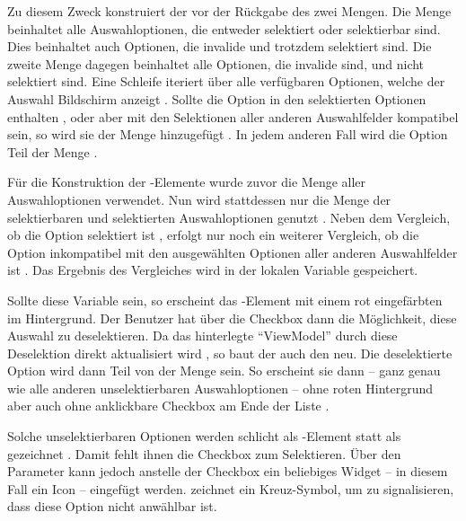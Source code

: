 Zu diesem Zweck konstruiert der  vor der Rückgabe des  zwei Mengen.
Die Menge   beinhaltet alle Auswahloptionen,
die entweder selektiert oder selektierbar sind.
Dies beinhaltet auch Optionen,
die invalide und trotzdem selektiert sind.
Die zweite Menge   dagegen beinhaltet alle Optionen,
die invalide sind,
und nicht selektiert sind.
Eine Schleife iteriert über alle verfügbaren Optionen,
welche der Auswahl Bildschirm anzeigt  .
Sollte die Option in den selektierten Optionen enthalten ,
oder aber mit den Selektionen aller anderen Auswahlfelder kompatibel sein,
so wird sie der Menge  hinzugefügt .
In jedem anderen Fall wird die Option Teil der Menge  .

Für die Konstruktion der -Elemente wurde zuvor die Menge aller Auswahloptionen verwendet.
Nun wird stattdessen nur die Menge der selektierbaren und selektierten Auswahloptionen genutzt .
Neben dem Vergleich,
ob die Option selektiert ist ,
erfolgt nur noch ein weiterer Vergleich,
ob die Option inkompatibel mit den ausgewählten Optionen aller anderen Auswahlfelder ist .
Das Ergebnis des Vergleiches wird in der lokalen Variable  gespeichert.

Sollte diese Variable  sein,
so erscheint das -Element mit einem rot eingefärbten im Hintergrund.
Der Benutzer hat über die Checkbox dann die Möglichkeit,
diese Auswahl zu deselektieren.
Da das hinterlegte \enquote{ViewModel} durch diese Deselektion direkt aktualisiert wird ,
so baut der  auch den  neu.
Die deselektierte Option wird dann Teil von der Menge   sein.
So erscheint sie dann
-- ganz genau wie alle anderen unselektierbaren Auswahloptionen --
ohne roten Hintergrund aber auch ohne anklickbare Checkbox am Ende der Liste .

Solche unselektierbaren Optionen werden schlicht als -Element statt als  gezeichnet .
Damit fehlt ihnen die Checkbox zum Selektieren.
Über den Parameter  kann jedoch anstelle der Checkbox ein beliebiges Widget
-- in diesem Fall ein Icon --
eingefügt werden.
 zeichnet ein Kreuz-Symbol,
um zu signalisieren,
dass diese Option nicht anwählbar ist. 



